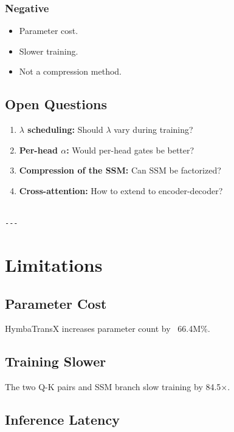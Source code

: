 \subsubsection{Negative}
\begin{itemize}
\item Parameter cost.
\item Slower training.
\item Not a compression method.

\end{itemize}
\subsection{Open Questions}

\begin{enumerate}
\item \textbf{$\lambda$ scheduling:} Should $\lambda$ vary during training?
\item \textbf{Per-head $\alpha$:} Would per-head gates be better?
\item \textbf{Compression of the SSM:} Can SSM be factorized?
\item \textbf{Cross-attention:} How to extend to encoder-decoder?
\end{enumerate}
\begin{lstlisting}

---
\end{lstlisting}

\section{Limitations}

\subsection{Parameter Cost}

HymbaTransX increases parameter count by ~66.4M\%.

\subsection{Training Slower}

The two Q-K pairs and SSM branch slow training by 84.5$\times$.

\subsection{Inference Latency}

